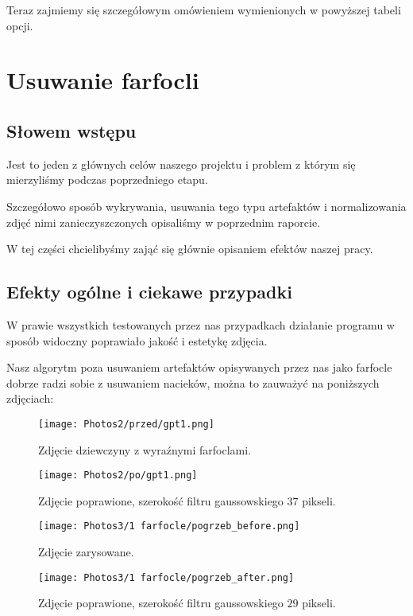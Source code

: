 \documentclass[]{mwart}
\begin{document}
Teraz zajmiemy się szczegółowym omówieniem wymienionych w powyższej tabeli opcji. \newpage






\section{Usuwanie farfocli}

\subsection{Słowem wstępu}
Jest to jeden z głównych celów naszego projektu i problem z którym się mierzyliśmy podczas poprzedniego etapu.

Szczegółowo sposób wykrywania, usuwania tego typu artefaktów i normalizowania
zdjęć nimi zanieczyszczonych opisaliśmy w poprzednim raporcie.

W tej części chcielibyśmy zająć się głównie opisaniem efektów naszej pracy.

\subsection{Efekty ogólne i ciekawe przypadki}
W prawie wszystkich testowanych przez nas przypadkach działanie programu w sposób widoczny poprawiało jakość i estetykę zdjęcia.

Nasz algorytm poza usuwaniem artefaktów opisywanych przez nas jako farfocle dobrze radzi sobie z usuwaniem nacieków, można
to zauważyć na poniższych zdjęciach:


\newpage

\begin{figure}[H]
    \centering
    \texttt{[image: Photos2/przed/gpt1.png]}
    \caption{Zdjęcie dziewczyny z wyraźnymi farfoclami.}
\end{figure}
\begin{figure}[H]
    \centering
    \texttt{[image: Photos2/po/gpt1.png]}
    \caption{Zdjęcie poprawione, szerokość filtru gaussowskiego $37$ pikseli.}
\end{figure}

\begin{figure}[H]
    \centering
    \texttt{[image: Photos3/1 farfocle/pogrzeb\_before.png]}
    \caption{Zdjęcie zarysowane.}
\end{figure}
\begin{figure}[H]
    \centering
    \texttt{[image: Photos3/1 farfocle/pogrzeb\_after.png]}
    \caption{Zdjęcie poprawione, szerokość filtru gaussowskiego $29$ pikseli.}
\end{figure}
\end{document}
